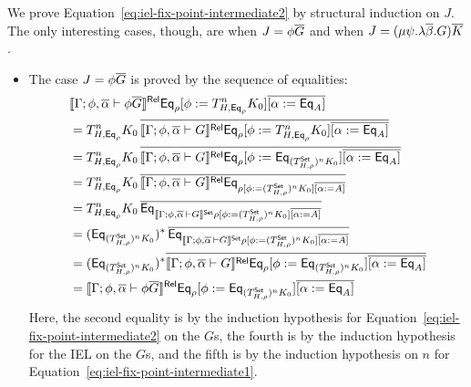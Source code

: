 \documentclass{lmcs}
\theoremstyle{plain}\newtheorem{satz}[thm]{Satz}
\newcommand{\set}{\mathsf{Set}}
\begin{document}
{\begin{itemize}
We prove Equation~\ref{eq:iel-fix-point-intermediate2} by structural
induction on $J$. The only interesting cases, though, are when $J =
\phi \overline{G}$ and when $J = (\mu \psi.\lambda \overline{\beta}. G)\overline{K}$.
\begin{itemize}
\item The case $J = \phi \overline{G}$ is proved by the sequence of equalities:
\[
\begin{split}
& \relsem{\Gamma; \phi, \ol{\alpha} \vdash \phi
    \ol{G}} \Eq_{\rho} [\phi := T^{n}_{H,\Eq_{\rho}} K_0]
  \overline{[\alpha := \Eq_A]}
  \\
&= T^{n}_{H,\Eq_{\rho}} K_0\, \overline{\relsem{\Gamma; 
      \phi, \ol{\alpha} \vdash G} \Eq_{\rho} [\phi :=
      T^{n}_{H,\Eq_{\rho}} K_0] \overline{[\alpha :=
        \Eq_A]}} \\ 
&= T^{n}_{H,\Eq_{\rho}} K_0\, \overline{\relsem{\Gamma; 
      \phi, \ol{\alpha} \vdash G} \Eq_{\rho} [\phi :=
      \Eq_{(T^\set_{H,\rho})^{n} K_0}] \overline{[\alpha :=
        \Eq_A]}} \\ 
&= T^{n}_{H,\Eq_{\rho}} K_0\, \overline{\relsem{\Gamma; 
      \phi, \ol{\alpha} \vdash G} \Eq_{\rho [\phi := (T^\set_{H,\rho})^{n}
        K_0] \overline{[\alpha := A]}}} \\ 
&= T^{n}_{H,\Eq_{\rho}} K_0\, \overline{\Eq_{\setsem{\Gamma;
        \phi, \ol{\alpha} \,\vdash G} \rho [\phi :=
        (T^\set_{H,\rho})^{n} K_0] \overline{[\alpha :=
          A]}}} \\ 
&= (\Eq_{(T^\set_{H,\rho})^{n} K_0})^* \,\overline{\Eq_{\setsem{\Gamma;
        \phi, \ol{\alpha} \,\vdash G} \rho [\phi :=
        (T^\set_{H,\rho})^{n} K_0] \overline{[\alpha :=
          A]}}} \\ 
&= (\Eq_{(T^\set_{H,\rho})^{n} K_0})^* \overline{\relsem{\Gamma;
      \phi, \ol{\alpha} \vdash G} \Eq_{\rho} [\phi :=
      \Eq_{(T^\set_{H,\rho})^{n} K_0}] \overline{[\alpha :=
        \Eq_A]}} \\ 
&= \relsem{\Gamma; \phi, \ol{\alpha} \vdash \phi \ol{G}}
  \Eq_{\rho} [\phi := \Eq_{(T^\set_{H,\rho})^{n} K_0}]
  \overline{[\alpha := \Eq_A]} 
\end{split}
\]
Here, the second equality is by the induction hypothesis for
Equation~\ref{eq:iel-fix-point-intermediate2} on the $G$s, the fourth
is by the induction hypothesis for the IEL on the $G$s, and the fifth
is by the induction hypothesis on $n$ for
Equation~\ref{eq:iel-fix-point-intermediate1}.


\end{itemize}
\end{itemize}}
\end{document}
